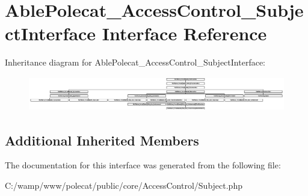 \hypertarget{interface_able_polecat___access_control___subject_interface}{}\section{Able\+Polecat\+\_\+\+Access\+Control\+\_\+\+Subject\+Interface Interface Reference}
\label{interface_able_polecat___access_control___subject_interface}
Inheritance diagram for Able\+Polecat\+\_\+\+Access\+Control\+\_\+\+Subject\+Interface\+:\begin{figure}[H]
\begin{center}
\leavevmode
\includegraphics[height=1.498829cm]{interface_able_polecat___access_control___subject_interface}
\end{center}
\end{figure}
\subsection*{Additional Inherited Members}


The documentation for this interface was generated from the following file\+:\begin{DoxyCompactItemize}
\item 
C\+:/wamp/www/polecat/public/core/\+Access\+Control/Subject.\+php\end{DoxyCompactItemize}
